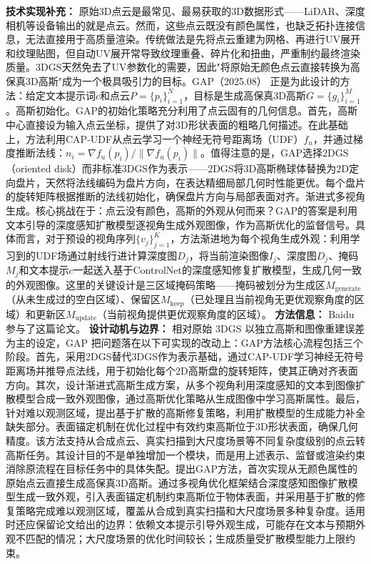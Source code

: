 \textbf{技术实现补充：} 原始3D点云是最常见、最易获取的3D数据形式——LiDAR、深度相机等设备输出的就是点云。然而，这些点云既没有颜色属性，也缺乏拓扑连接信息，无法直接用于高质量渲染。传统做法是先将点云重建为网格、再进行UV展开和纹理贴图，但自动UV展开常导致纹理重叠、碎片化和扭曲，严重制约最终渲染质量。3DGS天然免去了UV参数化的需要，因此"将原始无颜色点云直接转换为高保真3D高斯"成为一个极具吸引力的目标。GAP（2025.08） 正是为此设计的方法：给定文本提示词$c$和点云$P = \{p_i\}_{i=1}^N$，目标是生成高保真3D高斯$G = \{g_i\}_{i=1}^M$。高斯初始化。GAP的初始化策略充分利用了点云固有的几何信息。首先，高斯中心直接设为输入点云坐标，提供了对3D形状表面的粗略几何描述。在此基础上，方法利用CAP-UDF从点云学习一个神经无符号距离场（UDF）$f_u$，并通过梯度推断法线：$n_i = \nabla f_u(p_i) / \|\nabla f_u(p_i)\|$。值得注意的是，GAP选择2DGS（oriented disk）而非标准3DGS作为表示——2DGS将3D高斯椭球体替换为2D定向盘片，天然将法线编码为盘片方向，在表达精细局部几何时性能更优。每个盘片的旋转矩阵根据推断的法线初始化，确保盘片方向与局部表面对齐。渐进式多视角生成。核心挑战在于：点云没有颜色，高斯的外观从何而来？GAP的答案是利用文本引导的深度感知扩散模型逐视角生成外观图像，作为高斯优化的监督信号。具体而言，对于预设的视角序列$\{v_j\}_{j=1}^K$，方法渐进地为每个视角生成外观：利用学习到的UDF场通过射线行进计算深度图$D_j$，将当前渲染图像$I_j$、深度图$D_j$、掩码$M_j$和文本提示$c$一起送入基于ControlNet的深度感知修复扩散模型，生成几何一致的外观图像。这里的关键设计是三区域掩码策略——掩码被划分为生成区$M_{\mathrm{generate}}$（从未生成过的空白区域）、保留区$M_{\mathrm{keep}}$（已处理且当前视角无更优观察角度的区域）和更新区$M_{\mathrm{update}}$（当前视角提供更优观察角度的区域）。
\textbf{方法信息：} Baidu 参与了这篇论文。
\textbf{设计动机与边界：} 相对原始 3DGS 以独立高斯和图像重建误差为主的设定，GAP 把问题落在以下可实现的改动上：GAP方法核心流程包括三个阶段。首先，采用2DGS替代3DGS作为表示基础，通过CAP-UDF学习神经无符号距离场并推导点法线，用于初始化每个2D高斯盘的旋转矩阵，使其正确对齐表面方向。其次，设计渐进式高斯生成方案，从多个视角利用深度感知的文本到图像扩散模型合成一致外观图像，通过高斯优化策略从生成图像中学习高斯属性。最后，针对难以观测区域，提出基于扩散的高斯修复策略，利用扩散模型的生成能力补全缺失部分。表面锚定机制在优化过程中有效约束高斯位于3D形状表面，确保几何精度。该方法支持从合成点云、真实扫描到大尺度场景等不同复杂度级别的点云转高斯任务。其设计目的不是单独增加一个模块，而是用上述表示、监督或渲染约束消除原流程在目标任务中的具体失配。提出GAP方法，首次实现从无颜色属性的原始点云直接生成高保真3D高斯。通过多视角优化框架结合深度感知图像扩散模型生成一致外观，引入表面锚定机制约束高斯位于物体表面，并采用基于扩散的修复策略完成难以观测区域，覆盖从合成到真实扫描和大尺度场景多种复杂度。适用时还应保留论文给出的边界：依赖文本提示引导外观生成，可能存在文本与预期外观不匹配的情况；大尺度场景的优化时间较长；生成质量受扩散模型能力上限约束。

